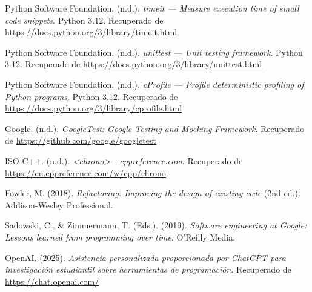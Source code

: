 \documentclass[12pt]{article}
\begin{document}
\newpage
\begin{thebibliography}{9}

Python Software Foundation. (n.d.). \textit{timeit — Measure execution time of small code snippets}. Python 3.12. Recuperado de \url{https://docs.python.org/3/library/timeit.html}

Python Software Foundation. (n.d.). \textit{unittest — Unit testing framework}. Python 3.12. Recuperado de \url{https://docs.python.org/3/library/unittest.html}

Python Software Foundation. (n.d.). \textit{cProfile — Profile deterministic profiling of Python programs}. Python 3.12. Recuperado de \url{https://docs.python.org/3/library/cprofile.html}

Google. (n.d.). \textit{GoogleTest: Google Testing and Mocking Framework}. Recuperado de \url{https://github.com/google/googletest}

ISO C++. (n.d.). \textit{<chrono> - cppreference.com}. Recuperado de \url{https://en.cppreference.com/w/cpp/chrono}

Fowler, M. (2018). \textit{Refactoring: Improving the design of existing code} (2nd ed.). Addison-Wesley Professional.

Sadowski, C., \& Zimmermann, T. (Eds.). (2019). \textit{Software engineering at Google: Lessons learned from programming over time}. O'Reilly Media.

OpenAI. (2025). \textit{Asistencia personalizada proporcionada por ChatGPT para investigación estudiantil sobre herramientas de programación}. Recuperado de \url{https://chat.openai.com/}

\end{thebibliography}
\end{document}
